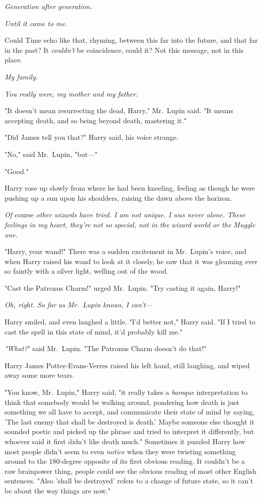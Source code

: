 \emph{Generation after generation.}

\emph{Until it came to me.}

Could Time echo like that, rhyming, between this far into the future, and that 
far in the past? It \emph{couldn't} be coincidence, could it? Not this message, 
not in this place.

\emph{My family.}

\emph{You really were, my mother and my father.}

"It doesn't mean resurrecting the dead, Harry," Mr.~Lupin said. "It means 
accepting death, and so being beyond death, mastering it."

"Did James tell you that?" Harry said, his voice strange.

"No," said Mr.~Lupin, "but---"

"Good."

Harry rose up slowly from where he had been kneeling, feeling as though he were 
pushing up a sun upon his shoulders, raising the dawn above the horizon.

\emph{Of} course\emph{ other wizards have tried. I am not unique. I was never 
alone. These feelings in my heart, they're not so special, not in the wizard 
world or the Muggle one.}

"Harry, your wand!" There was a sudden excitement in Mr.~Lupin's voice, and 
when Harry raised his wand to look at it closely, he saw that it was gleaming 
ever so faintly with a silver light, welling out of the wood.

"Cast the Patronus Charm!" urged Mr.~Lupin. "Try casting it again, Harry!"

\emph{Oh, right. So far as Mr.~Lupin knows, I can't---}

Harry smiled, and even laughed a little. "I'd better not," Harry said. "If I 
tried to cast the spell in this state of mind, it'd probably kill me."

\emph{"What?}" said Mr.~Lupin. "The Patronus Charm doesn't do that!"

Harry James Potter-Evans-Verres raised his left hand, still laughing, and wiped 
away some more tears.

"You know, Mr.~Lupin," Harry said, "it really takes a \emph{baroque} 
interpretation to think that somebody would be walking around, pondering how 
death is just something we all have to accept, and communicate their state of 
mind by saying, 'The last enemy that shall be destroyed is death.' Maybe 
someone else thought it sounded poetic and picked up the phrase and tried to 
interpret it differently, but whoever said it first didn't like death much." 
Sometimes it puzzled Harry how most people didn't seem to even \emph{notice} 
when they were twisting something around to the 180-degree opposite of its 
first obvious reading. It couldn't be a raw brainpower thing, people could see 
the obvious reading of most other English sentences. "Also 'shall be destroyed' 
refers to a change of future state, so it can't be about the way things are 
now."

